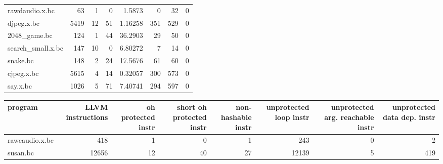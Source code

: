\begin{tabular}{lrrrrrrr}
 rawdaudio.x.bc       &                 63 &                     1 &                           0 &               1.5873   &                     0 &                        32 &                             0 \\
 djpeg.x.bc           &               5419 &                    12 &                          51 &               1.16258  &                   351 &                       529 &                             0 \\
 2048\_game.bc         &                124 &                     1 &                          44 &              36.2903   &                    29 &                        50 &                             0 \\
 search\_small.x.bc    &                147 &                    10 &                           0 &               6.80272  &                     7 &                        14 &                             0 \\
 snake.bc             &                148 &                     2 &                          24 &              17.5676   &                    61 &                        60 &                             0 \\
 cjpeg.x.bc           &               5615 &                     4 &                          14 &               0.32057  &                   300 &                       573 &                             0 \\
 say.x.bc             &               1026 &                     5 &                          71 &               7.40741  &                   294 &                       597 &                             0 \\
\hline
\end{tabular}\begin{tabular}{lrrrrrrr}
\hline
 program              &   LLVM instructions &   oh protected instr &   short oh protected instr &   non-hashable instr &   unprotected loop instr &   unprotected arg. reachable instr &   unprotected data dep. instr \\
\hline
 rawcaudio.x.bc       &                 418 &                    1 &                          0 &                    1 &                      243 &                                  0 &                             2 \\
 susan.bc             &               12656 &                   12 &                         40 &                   27 &                    12139 &                                  5 &                           419 \\

\end{tabular}
